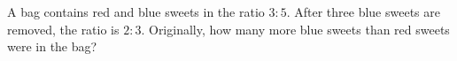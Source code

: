 A bag contains red and blue sweets in the ratio $3:5$. After three blue sweets are removed, the ratio is $2:3$. Originally, how many more blue sweets than red sweets were in the bag?
